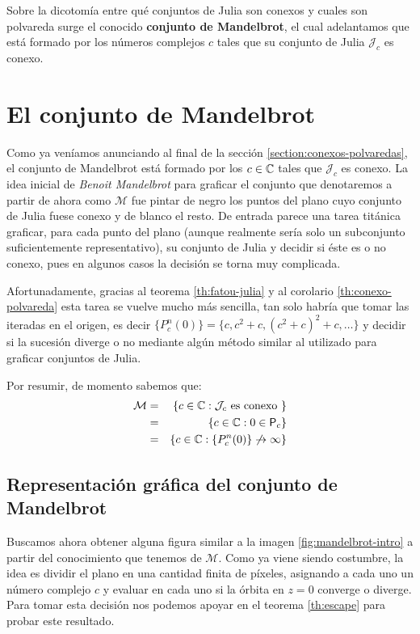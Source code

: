 Sobre la dicotomía entre qué conjuntos de Julia son conexos y cuales son polvareda surge el conocido \textbf{conjunto de Mandelbrot}, el cual adelantamos que está formado por los números complejos $c$ tales que su conjunto de Julia $\mathcal{J}_c$ es conexo. 

\section{El conjunto de Mandelbrot}
\label{section:Mandelbrot}

Como ya veníamos anunciando al final de la sección \ref{section:conexos-polvaredas}, el conjunto de Mandelbrot está formado por los $c\in\mathbb{C}$ tales que $\mathcal{J}_c$ es conexo. La idea inicial de \textit{Benoit Mandelbrot} para graficar el conjunto que denotaremos a partir de ahora como $\mathcal{M}$ fue pintar de negro los puntos del plano cuyo conjunto de Julia fuese conexo y de blanco el resto. De entrada parece una tarea titánica graficar, para cada punto del plano (aunque realmente sería solo un subconjunto suficientemente representativo), su conjunto de Julia y decidir si éste es o no conexo, pues en algunos casos la decisión se torna muy complicada.

Afortunadamente, gracias al teorema \ref{th:fatou-julia} y al corolario \ref{th:conexo-polvareda} esta tarea se vuelve mucho más sencilla, tan solo habría que tomar las iteradas en el origen, es decir $\{P_c^n(0)\}=\{c, c^2+c, (c^2+c)^2+c, \dots\}$ y decidir si la sucesión diverge o no mediante algún método similar al utilizado para graficar conjuntos de Julia.

Por resumir, de momento sabemos que:
\begin{eqnarray*}
  \mathcal{M} & = & \{c\in\mathbb{C} : \mathcal{J}_c \text{ es conexo }\} \\
              & = & \{c\in\mathbb{C} : 0\in\mathsf{P}_c \} \\
              & = & \{c\in\mathbb{C} : \{P_c^n(0)\}\not\rightarrow\infty\}
\end{eqnarray*}

\subsection{Representación gráfica del conjunto de Mandelbrot}
\label{subsection:representacion-mandelbrot}

Buscamos ahora obtener alguna figura similar a la imagen \ref{fig:mandelbrot-intro} a partir del conocimiento que tenemos de $\mathcal M$. Como ya viene siendo costumbre, la idea es dividir el plano en una cantidad finita de píxeles, asignando a cada uno un número complejo $c$ y evaluar en cada uno si la órbita en $z=0$ converge o diverge. Para tomar esta decisión nos podemos apoyar en el teorema \ref{th:escape} para probar este resultado.

